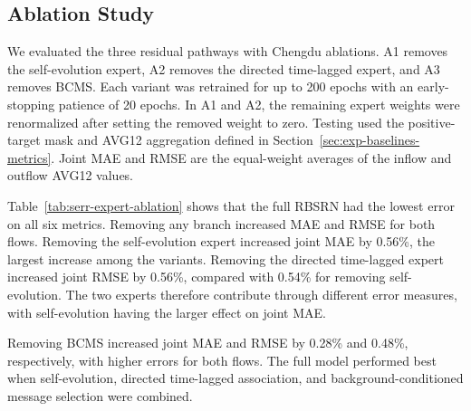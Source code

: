 \subsection{Ablation Study}\label{sec:exp-ablation}

We evaluated the three residual pathways with Chengdu ablations. A1 removes the self-evolution expert, A2 removes the directed time-lagged expert, and A3 removes BCMS. Each variant was retrained for up to 200 epochs with an early-stopping patience of 20 epochs. In A1 and A2, the remaining expert weights were renormalized after setting the removed weight to zero. Testing used the positive-target mask and AVG12 aggregation defined in Section~\ref{sec:exp-baselines-metrics}. Joint MAE and RMSE are the equal-weight averages of the inflow and outflow AVG12 values.


\FloatBarrier

Table~\ref{tab:serr-expert-ablation} shows that the full RBSRN had the lowest error on all six metrics. Removing any branch increased MAE and RMSE for both flows. Removing the self-evolution expert increased joint MAE by 0.56\%, the largest increase among the variants. Removing the directed time-lagged expert increased joint RMSE by 0.56\%, compared with 0.54\% for removing self-evolution. The two experts therefore contribute through different error measures, with self-evolution having the larger effect on joint MAE.

Removing BCMS increased joint MAE and RMSE by 0.28\% and 0.48\%, respectively, with higher errors for both flows. The full model performed best when self-evolution, directed time-lagged association, and background-conditioned message selection were combined.
\FloatBarrier
